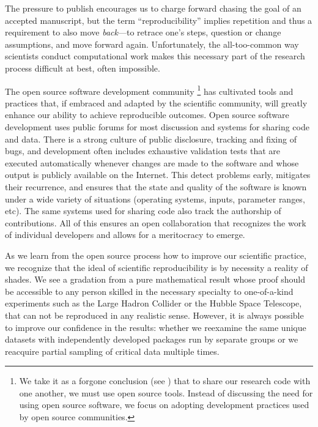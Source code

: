 \documentclass[ChapterTOCs,krantz2]{krantz} %
\begin{document}
The pressure to publish encourages us to charge forward chasing the goal of an
accepted manuscript, but the term ``reproducibility'' implies repetition
and thus a requirement to also move \emph{back}---to retrace one's steps,
question or change assumptions, and move forward again. Unfortunately, the
all-too-common way scientists conduct computational work makes this necessary
part of the research process difficult at best, often impossible.

The open source software development community%
\footnote{We take
  it as a forgone conclusion (see \cite{joyner2007open}) that to share our research
  code with one another, we must use
  open source tools.  Instead of discussing the need for using open source
  software, we focus on adopting development practices used by open source
  communities.}
has cultivated tools and practices that, if embraced and adapted by the
scientific community, will greatly enhance our ability to achieve reproducible
outcomes.  Open source software development uses public forums for most
discussion and systems for sharing code and data. There is a strong culture of
public disclosure, tracking and fixing of bugs, and development often includes
exhaustive validation tests that are executed automatically whenever changes
are made to the software and whose output is publicly available on the
Internet. This detect problems early, mitigates their recurrence, and ensures
that the state and quality of the software is known under a wide variety of
situations (operating systems, inputs, parameter ranges, etc).  The same
systems used for sharing code also track the authorship of contributions. All
of this ensures an open collaboration that recognizes the work of individual
developers and allows for a meritocracy to emerge.

As we learn from the open source process how to improve our scientific
practice, we recognize that the ideal of scientific reproducibility is by
necessity a reality of shades. We see a gradation from a pure mathematical
result whose proof should be accessible to any person skilled in the necessary
specialty to one-of-a-kind experiments such as the Large Hadron Collider or the
Hubble Space Telescope, that can not be reproduced in any realistic sense.
However, it is always possible to improve our confidence in the results:
whether we reexamine the same unique datasets with independently developed
packages run by separate groups or we reacquire partial sampling of critical
data multiple times.
\end{document}
